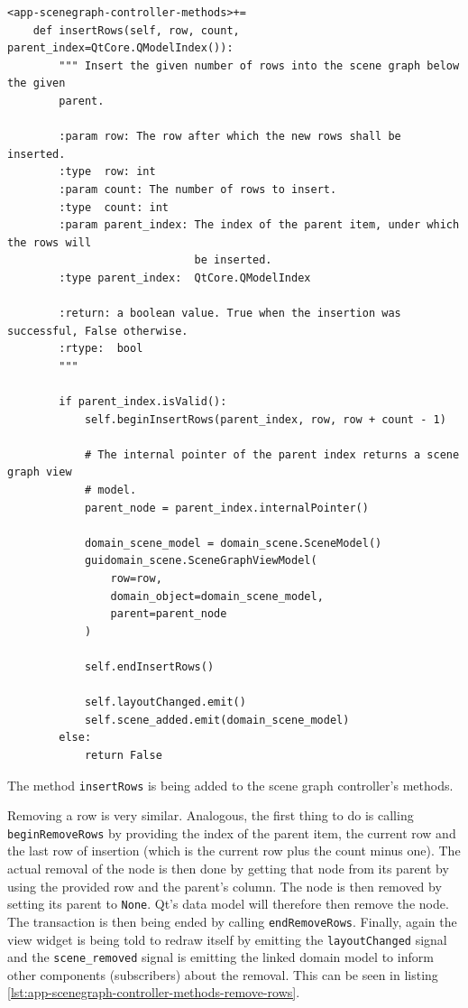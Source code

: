 \documentclass[10pt, openright, notitlepage]{scrreprt}
\begin{document}
\begin{listing}[H]
\begin{verbatim}
<app-scenegraph-controller-methods>+=
    def insertRows(self, row, count, parent_index=QtCore.QModelIndex()):
        """ Insert the given number of rows into the scene graph below the given
        parent.
    
        :param row: The row after which the new rows shall be inserted.
        :type  row: int
        :param count: The number of rows to insert.
        :type  count: int
        :param parent_index: The index of the parent item, under which the rows will
                             be inserted.
        :type parent_index:  QtCore.QModelIndex
    
        :return: a boolean value. True when the insertion was successful, False otherwise.
        :rtype:  bool
        """
    
        if parent_index.isValid():
            self.beginInsertRows(parent_index, row, row + count - 1)
    
            # The internal pointer of the parent index returns a scene graph view
            # model.
            parent_node = parent_index.internalPointer()
    
            domain_scene_model = domain_scene.SceneModel()
            guidomain_scene.SceneGraphViewModel(
                row=row,
                domain_object=domain_scene_model,
                parent=parent_node
            )
    
            self.endInsertRows()
    
            self.layoutChanged.emit()
            self.scene_added.emit(domain_scene_model)
        else:
            return False
\end{verbatim}
\caption{\label{lst:app-scenegraph-controller-methods-insert-rows}
The method \texttt{insertRows} is being added to the scene graph controller's methods.}
\end{listing}

Removing a row is very similar. Analogous, the first thing to do is calling
\texttt{beginRemoveRows} by providing the index of the parent item, the
current row and the last row of insertion (which is the current row plus the
count minus one).
The actual removal of the node is then done by getting that node from its parent
by using the provided row and the parent's column. The node is then removed by
setting its parent to \texttt{None}. Qt's data model will therefore then remove the
node. The transaction is then being ended by calling \texttt{endRemoveRows}.
Finally, again the view widget is being told to redraw itself by emitting the
\texttt{layoutChanged} signal and the \texttt{scene\_removed} signal is
emitting the linked domain model to inform other components (subscribers) about
the removal. This can be seen in listing
\ref{lst:app-scenegraph-controller-methods-remove-rows}.
\end{document}
